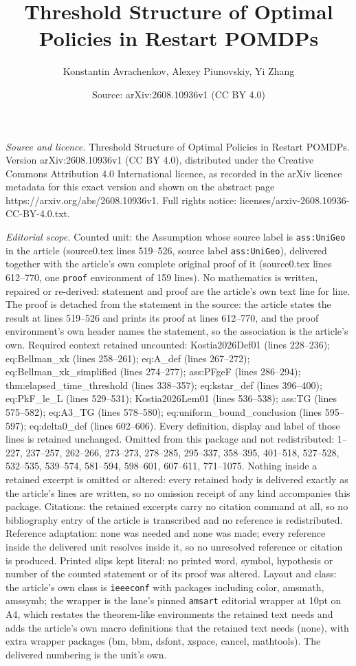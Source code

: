 \documentclass[10pt,a4paper]{amsart}
\title[Threshold Structure of Optimal Policies in Restart POMDPs]{Threshold Structure of Optimal Policies in Restart POMDPs}
\author{Konstantin Avrachenkov, Alexey Piunovskiy, Yi Zhang}
\date{Source: arXiv:2608.10936v1 (CC BY 4.0)}
\begin{document}
\maketitle

\noindent\emph{Source and licence.} Threshold Structure of Optimal Policies in Restart POMDPs. Version arXiv:2608.10936v1 (CC BY 4.0), distributed under the Creative Commons Attribution 4.0 International licence, as recorded in the arXiv licence metadata for this exact version and shown on the abstract page https://arxiv.org/abs/2608.10936v1. Full rights notice: licenses/arxiv-2608.10936-CC-BY-4.0.txt.\par\smallskip

\noindent\textit{Editorial scope.} Counted unit: the Assumption whose source label is \texttt{ass:UniGeo} in the article (source0.tex lines 519--526, source label \texttt{ass:UniGeo}), delivered together with the article's own complete original proof of it (source0.tex lines 612--770, one \texttt{proof} environment of 159 lines). No mathematics is written, repaired or re-derived: statement and proof are the article's own text line for line. The proof is detached from the statement in the source: the article states the result at lines 519--526 and prints its proof at lines 612--770, and the proof environment's own header names the statement, so the association is the article's own. Required context retained uncounted: Kostia2026Def01 (lines 228--236); eq:Bellman\_xk (lines 258--261); eq:A\_def (lines 267--272); eq:Bellman\_xk\_simplified (lines 274--277); ass:PFgeF (lines 286--294); thm:elapsed\_time\_threshold (lines 338--357); eq:kstar\_def (lines 396--400); eq:PkF\_le\_L (lines 529--531); Kostia2026Lem01 (lines 536--538); ass:TG (lines 575--582); eq:A3\_TG (lines 578--580); eq:uniform\_bound\_conclusion (lines 595--597); eq:delta0\_def (lines 602--606). Every definition, display and label of those lines is retained unchanged. Omitted from this package and not redistributed: 1--227, 237--257, 262--266, 273--273, 278--285, 295--337, 358--395, 401--518, 527--528, 532--535, 539--574, 581--594, 598--601, 607--611, 771--1075. Nothing inside a retained excerpt is omitted or altered: every retained body is delivered exactly as the article's lines are written, so no omission receipt of any kind accompanies this package. Citations: the retained excerpts carry no citation command at all, so no bibliography entry of the article is transcribed and no reference is redistributed. Reference adaptation: none was needed and none was made; every reference inside the delivered unit resolves inside it, so no unresolved reference or citation is produced. Printed slips kept literal: no printed word, symbol, hypothesis or number of the counted statement or of its proof was altered. Layout and class: the article's own class is \texttt{ieeeconf} with packages including color, amsmath, amssymb; the wrapper is the lane's pinned \texttt{amsart} editorial wrapper at 10pt on A4, which restates the theorem-like environments the retained text needs and adds the article's own macro definitions that the retained text needs (none), with extra wrapper packages (bm, bbm, dsfont, xspace, cancel, mathtools). The delivered numbering is the unit's own. 
\end{document}
